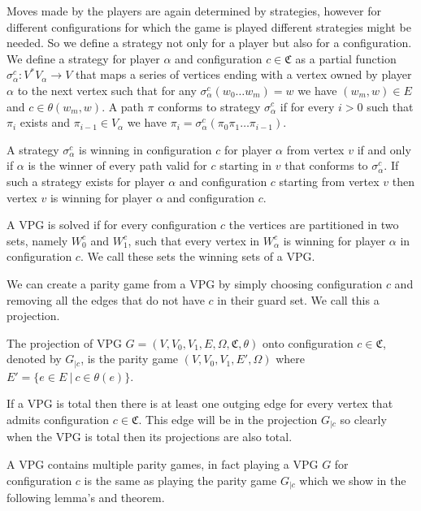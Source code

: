 Moves made by the players are again determined by strategies, however for different configurations for which the game is played different strategies might be needed. So we define a strategy not only for a player but also for a configuration. We define a strategy for player $\alpha$ and configuration $c \in \mathfrak{C}$ as a partial function $\sigma_\alpha^c : V^*V_\alpha \rightarrow V$ that maps a series of vertices ending with a vertex owned by player $\alpha$ to the next vertex such that for any $\sigma_\alpha^c(w_0\dots w_m) = w$ we have $(w_m,w) \in E$ and $c \in \theta(w_m,w)$. A path $\pi$ conforms to strategy $\sigma_\alpha^c$ if for every $i > 0$ such that $\pi_i$ exists and $\pi_{i-1}\in V_\alpha$ we have $\pi_i = \sigma_\alpha^c(\pi_0\pi_1\dots\pi_{i-1})$.

A strategy $\sigma_\alpha^c$ is winning in configuration $c$ for player $\alpha$ from vertex $v$ if and only if $\alpha$ is the winner of every path valid for $c$ starting in $v$ that conforms to $\sigma_\alpha^c$. If such a strategy exists for player $\alpha$ and configuration $c$ starting from vertex $v$ then vertex $v$ is winning for player $\alpha$ and configuration $c$.

A VPG is solved if for every configuration $c$ the vertices are partitioned in two sets, namely $W_0^c$ and $W_1^c$, such that every vertex in $W_\alpha^c$ is winning for player $\alpha$ in configuration $c$. We call these sets the winning sets of a VPG.

We can create a parity game from a VPG by simply choosing configuration $c$ and removing all the edges that do not have $c$ in their guard set. We call this a projection.

\begin{definition}
	\label{def_vpg_proj}
	The projection of VPG $G = (V,V_0,V_1,E,\Omega, \mathfrak{C},\theta)$ onto configuration $c\in \mathfrak{C}$, denoted by $G_{|c}$, is the parity game $(V,V_0,V_1,E',\Omega)$ where $E' = \{ e \in E\ |\ c \in \theta(e)\}$.
\end{definition}
If a VPG is total then there is at least one outging edge for every vertex that admits configuration $c \in \mathfrak{C}$. This edge will be in the projection $G_{|c}$ so clearly when the VPG is total then its projections are also total.

A VPG contains multiple parity games, in fact playing a VPG $G$ for configuration $c$ is the same as playing the parity game $G_{|c}$ which we show in the following lemma's and theorem.

